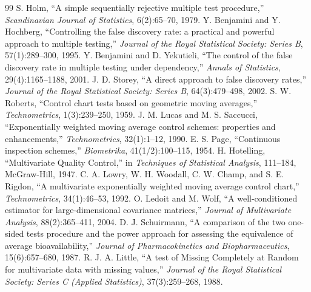 \documentclass[11pt]{article}
\begin{document}
\begin{thebibliography}{99}
 S. Holm, ``A simple sequentially rejective multiple test procedure,'' \emph{Scandinavian Journal of Statistics}, 6(2):65--70, 1979.
 Y. Benjamini and Y. Hochberg, ``Controlling the false discovery rate: a practical and powerful approach to multiple testing,'' \emph{Journal of the Royal Statistical Society: Series B}, 57(1):289--300, 1995.
 Y. Benjamini and D. Yekutieli, ``The control of the false discovery rate in multiple testing under dependency,'' \emph{Annals of Statistics}, 29(4):1165--1188, 2001.
 J. D. Storey, ``A direct approach to false discovery rates,'' \emph{Journal of the Royal Statistical Society: Series B}, 64(3):479--498, 2002.
 S. W. Roberts, ``Control chart tests based on geometric moving averages,'' \emph{Technometrics}, 1(3):239--250, 1959.
 J. M. Lucas and M. S. Saccucci, ``Exponentially weighted moving average control schemes: properties and enhancements,'' \emph{Technometrics}, 32(1):1--12, 1990.
 E. S. Page, ``Continuous inspection schemes,'' \emph{Biometrika}, 41(1/2):100--115, 1954.
 H. Hotelling, ``Multivariate Quality Control,'' in \emph{Techniques of Statistical Analysis}, 111--184, McGraw-Hill, 1947.
 C. A. Lowry, W. H. Woodall, C. W. Champ, and S. E. Rigdon, ``A multivariate exponentially weighted moving average control chart,'' \emph{Technometrics}, 34(1):46--53, 1992.
 O. Ledoit and M. Wolf, ``A well-conditioned estimator for large-dimensional covariance matrices,'' \emph{Journal of Multivariate Analysis}, 88(2):365--411, 2004.
 D. J. Schuirmann, ``A comparison of the two one-sided tests procedure and the power approach for assessing the equivalence of average bioavailability,'' \emph{Journal of Pharmacokinetics and Biopharmaceutics}, 15(6):657--680, 1987.
 R. J. A. Little, ``A test of Missing Completely at Random for multivariate data with missing values,'' \emph{Journal of the Royal Statistical Society: Series C (Applied Statistics)}, 37(3):259--268, 1988.
\end{thebibliography}
\end{document}
